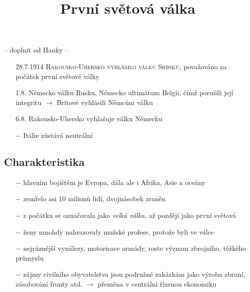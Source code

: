 \documentclass{article}
\title{\vspace{-2cm}První světová válka\vspace{-1.7cm}}
\date{}
\author{}
\begin{document}
\maketitle

-- doplnit od Hanky --

\begin{itemize}
    \vspace{-0.5em}
    \setlength\itemsep{0.15em}
    \item[28.7.1914] \textsc{Rakousko-Uhersko vyhlásilo válku Srbsku}, považováno za počátek první světové války
    \item[1.8.] Německo válku Rusku, Německo ultimátum Belgii, čímž porušili její integritu $\rightarrow$ Britové vyhlásili Němcům válku
    \item[6.8.] Rakousko-Uhersko vyhlašuje válku Německu
    \item[$-$] Itálie zůstává neutrální
\end{itemize}

\subsection*{Charakteristika}
\begin{itemize}
    \vspace{-0.5em}
    \setlength\itemsep{0.15em}
    \item[$-$] hlavním bojištěm je Evropa, dála ale i Afrika, Asie a oceány
    \item[$-$] zemřelo asi 10 milionů lidí, dvojnásobek zraněn
    \item[$-$] z počátku se označovala jako \textit{velká válka}, až později jako první světová
    \item[$-$] ženy mnohdy nahrazovaly mužské profese, protože byli ve válce
    \item[$-$] nejrůznější vynálezy, motorisace armády, roste význam zbrojního, těžkého průmyslu
    \item[$-$] zájmy civilního obyvatelstva jsou podružné zakázkám jako výroba zbraní, zásobování fronty atd. $\rightarrow$ přeměna v centrální řízenou ekonomiku
\end{itemize}
\end{document}
